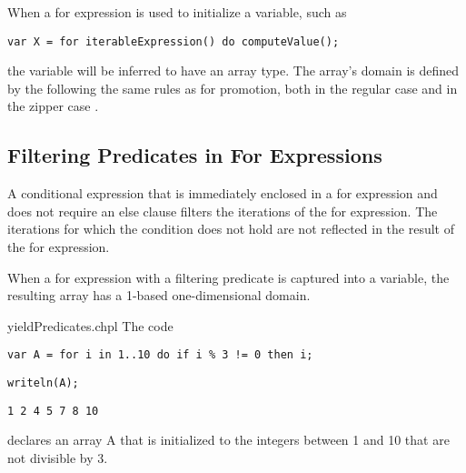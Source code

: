 When a for expression is used to initialize a variable, such as
\begin{chapel}
\begin{verbatim}
var X = for iterableExpression() do computeValue();
\end{verbatim}
\end{chapel}
the variable will be inferred to have an array type.
The array's domain is defined by the 
following the same rules as for promotion, both in the regular
case  and in the zipper case .

\subsection{Filtering Predicates in For Expressions}
\label{Filtering_Predicates_For}

A conditional expression that is immediately enclosed in a for
expression and does not require an else clause filters the iterations
of the for expression.
The iterations for which the condition does not hold
are not reflected in the result of the for expression.

When a for expression with a filtering predicate is captured into
a variable, the resulting array has a 1-based one-dimensional domain.

\begin{chapelexample}{yieldPredicates.chpl}
The code
\begin{chapel}
\begin{verbatim}
var A = for i in 1..10 do if i % 3 != 0 then i;
\end{verbatim}
\end{chapel}
\begin{chapelpost}
\begin{verbatim}
writeln(A);
\end{verbatim}
\end{chapelpost}
\begin{chapeloutput}
\begin{verbatim}
1 2 4 5 7 8 10
\end{verbatim}
\end{chapeloutput}
declares an array A that is initialized to the integers between
1 and 10 that are not divisible by 3.
\end{chapelexample}
